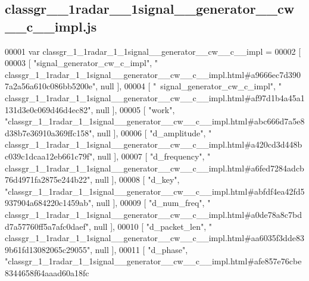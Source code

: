 \subsection{classgr\+\_\+\_\+1radar\+\_\+\_\+1signal\+\_\+\+\_\+generator\+\_\+\+\_\+cw\+\_\+\+\_\+c\+\_\+\+\_\+impl.\+js}
\label{classgr__1__1radar__1__1signal____generator____cw____c____impl_8js_source}

\begin{DoxyCode}
00001 var classgr_1_1radar_1_1signal__generator__cw__c__impl =
00002 [
00003     [ \textcolor{stringliteral}{"signal\_generator\_cw\_c\_impl"}, \textcolor{stringliteral}{"
      classgr\_1\_1radar\_1\_1signal\_\_generator\_\_cw\_\_c\_\_impl.html#a9666ec7d3907a2a56a610c086bb5200e"}, null ],
00004     [ \textcolor{stringliteral}{"~signal\_generator\_cw\_c\_impl"}, \textcolor{stringliteral}{"
      classgr\_1\_1radar\_1\_1signal\_\_generator\_\_cw\_\_c\_\_impl.html#af97d1b4a45a1131d3e0c069d46d4ec82"}, null ],
00005     [ \textcolor{stringliteral}{"work"}, \textcolor{stringliteral}{"classgr\_1\_1radar\_1\_1signal\_\_generator\_\_cw\_\_c\_\_impl.html#abc666d7a5e8d38b7e36910a369ffc158"}, 
      null ],
00006     [ \textcolor{stringliteral}{"d\_amplitude"}, \textcolor{stringliteral}{"
      classgr\_1\_1radar\_1\_1signal\_\_generator\_\_cw\_\_c\_\_impl.html#a420cd3d448bc039c1dcaa12eb661c79f"}, null ],
00007     [ \textcolor{stringliteral}{"d\_frequency"}, \textcolor{stringliteral}{"
      classgr\_1\_1radar\_1\_1signal\_\_generator\_\_cw\_\_c\_\_impl.html#a6fed7284adcb76d4971fa2875e244b22"}, null ],
00008     [ \textcolor{stringliteral}{"d\_key"}, \textcolor{stringliteral}{"classgr\_1\_1radar\_1\_1signal\_\_generator\_\_cw\_\_c\_\_impl.html#abfdf4ea42fd5937904a684220c1459ab"},
       null ],
00009     [ \textcolor{stringliteral}{"d\_num\_freq"}, \textcolor{stringliteral}{"
      classgr\_1\_1radar\_1\_1signal\_\_generator\_\_cw\_\_c\_\_impl.html#a0de78a8c7bdd7a57760ff5a7afc0daef"}, null ],
00010     [ \textcolor{stringliteral}{"d\_packet\_len"}, \textcolor{stringliteral}{"
      classgr\_1\_1radar\_1\_1signal\_\_generator\_\_cw\_\_c\_\_impl.html#aa6035f3dde839b61fd13082065c29055"}, null ],
00011     [ \textcolor{stringliteral}{"d\_phase"}, \textcolor{stringliteral}{"classgr\_1\_1radar\_1\_1signal\_\_generator\_\_cw\_\_c\_\_impl.html#afe857e76cbe8344658f64aaad60a18fc
}
\end{DoxyCode}
